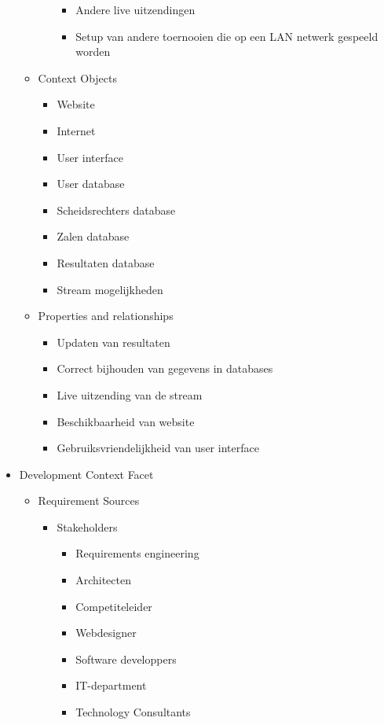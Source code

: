 \documentclass[12pt,a4paper]{article}
\begin{document}
\begin{itemize}
\begin{itemize}
\begin{itemize}
\begin{itemize}
						\item Andere live uitzendingen
						\item Setup van andere toernooien die op een LAN netwerk gespeeld worden
					\end{itemize}
				\end{itemize}
				\item Context Objects
				\begin{itemize}
					\item Website
					\item Internet
					\item User interface
					\item User database
					\item Scheidsrechters database
					\item Zalen database
					\item Resultaten database
					\item Stream mogelijkheden
				\end{itemize}
				\item Properties and relationships
				\begin{itemize}
					\item Updaten van resultaten
					\item Correct bijhouden van gegevens in databases
					\item Live uitzending van de stream
					\item Beschikbaarheid van website
					\item Gebruiksvriendelijkheid van user interface
				\end{itemize}
			\end{itemize}
			\item Development Context Facet
			\begin{itemize}
				\item Requirement Sources
				\begin{itemize}
					\item Stakeholders
					\begin{itemize}
						\item Requirements engineering
						\item Architecten
						\item Competiteleider
						\item Webdesigner
						\item Software developpers
						\item IT-department
						\item Technology Consultants
					\end{itemize}

\end{itemize}
\end{itemize}
\end{itemize}
\end{document}
